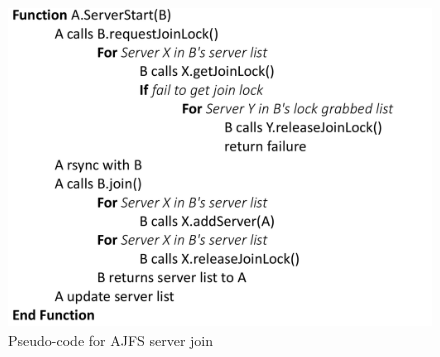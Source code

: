 \begin{figure}[Ht]
\includegraphics[width=\linewidth]{algorithm.pdf}
\caption{Pseudo-code for AJFS server join}
\label{fig:algorithm}
\vspace{-5mm}
\end{figure}



